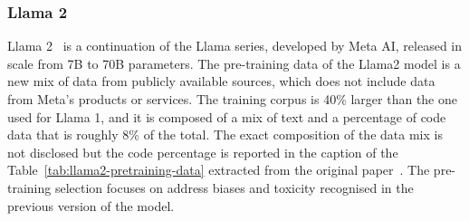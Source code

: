 \subsubsection{Llama 2}
\label{subsubsec:llama-2}

Llama 2~\cite{touvron2023llama2} is a continuation of the Llama series, developed by Meta AI, released in scale from 7B to 70B parameters.
The pre-training data of the Llama2 model is a new mix of data from publicly available sources, which does not include data from Meta's products or services.
The training corpus is 40\% larger than the one used for Llama 1, and it is composed of a mix of text and a percentage of code data that is roughly 8\% of the total.
The exact composition of the data mix is not disclosed but the code percentage is reported in the caption of the Table~\ref{tab:llama2-pretraining-data} extracted from the original paper~\cite{touvron2023llama2}.
The pre-training selection focuses on address biases and toxicity recognised in the previous version of the model.

